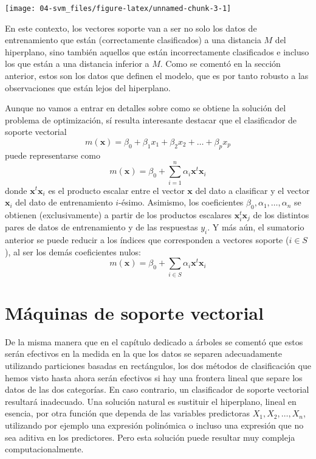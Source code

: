 \documentclass[
  spanish,
]{book}
\theoremstyle{break}
\theoremstyle{definition}
\theoremstyle{definition}
\theoremstyle{definition}
\theoremstyle{remark}
\begin{document}
\begin{center}\texttt{[image: 04-svm\_files/figure-latex/unnamed-chunk-3-1]} \end{center}

En este contexto, los vectores soporte van a ser no solo los datos de entrenamiento que están (correctamente clasificados) a una distancia \(M\) del hiperplano, sino también aquellos que están incorrectamente clasificados e incluso los que están a una distancia inferior a \(M\). Como se comentó en la sección anterior, estos son los datos que definen el modelo, que es por tanto robusto a las observaciones que están lejos del hiperplano.

Aunque no vamos a entrar en detalles sobre como se obtiene la solución del problema de optimización, sí resulta interesante destacar que el clasificador de soporte vectorial
\[m(\mathbf{x}) = \beta_0 + \beta_1 x_1 + \beta_2 x_2 + \ldots + \beta_p x_p\]
puede representarse como
\[m(\mathbf{x}) = \beta_0 + \sum_{i=1}^n \alpha_i \mathbf{x}^t \mathbf{x}_i\]
donde \(\mathbf{x}^t \mathbf{x}_i\) es el producto escalar entre el vector \(\mathbf{x}\) del dato a clasificar y el vector \(\mathbf{x}_i\) del dato de entrenamiento \(i\)-ésimo. Asimismo, los coeficientes \(\beta_0, \alpha_1, \ldots, \alpha_n\) se obtienen (exclusivamente) a partir de los productos escalares \(\mathbf{x}_i^t \mathbf{x}_j\) de los distintos pares de datos de entrenamiento y de las respuestas \(y_i\). Y más aún, el sumatorio anterior se puede reducir a los índices que corresponden a vectores soporte (\(i\in S\)), al ser los demás coeficientes nulos:
\[m(\mathbf{x}) = \beta_0 + \sum_{i\in S} \alpha_i \mathbf{x}^t \mathbf{x}_i\]

\hypertarget{muxe1quinas-de-soporte-vectorial}{%
\section{Máquinas de soporte vectorial}\label{muxe1quinas-de-soporte-vectorial}}

De la misma manera que en el capítulo dedicado a árboles se comentó que estos serán efectivos en la medida en la que los datos se separen adecuadamente utilizando particiones basadas en rectángulos, los dos métodos de clasificación que hemos visto hasta ahora serán efectivos si hay una frontera lineal que separe los datos de las dos categorías. En caso contrario, un clasificador de soporte vectorial resultará inadecuado. Una solución natural es sustituir el hiperplano, lineal en esencia, por otra función que dependa de las variables predictoras \(X_1,X_2, \ldots, X_n\), utilizando por ejemplo una expresión polinómica o incluso una expresión que no sea aditiva en los predictores. Pero esta solución puede resultar muy compleja computacionalmente.
\end{document}
